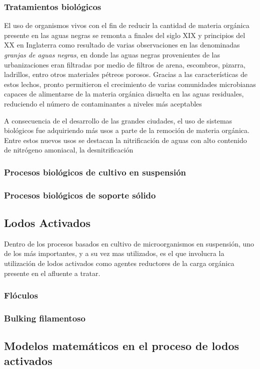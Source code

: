 \subsubsection{Tratamientos biológicos}
El uso de organismos vivos con el fin de reducir la cantidad de materia orgánica presente en las aguas negras se remonta a finales del siglo XIX y principios del XX en Inglaterra como resultado de varias observaciones en las denominadas \emph{granjas de aguas negras}, en donde las aguas negras provenientes de las urbanizaciones eran filtradas por medio de filtros de arena, escombros, pizarra, ladrillos, entro otros materiales pétreos porosos. Gracias a las características de estos lechos, pronto permitieron el crecimiento de varias comunidades microbianas capaces de alimentarse de la materia orgánica disuelta en las aguas residuales, reduciendo el número de contaminantes a niveles más aceptables~\citep{Fair2008}\par
A consecuencia de el desarrollo de las grandes ciudades, el uso de sistemas biológicos fue adquiriendo más usos a parte de la remoción de materia orgánica. Entre estos nuevos usos se destacan la nitrificación de aguas con alto contenido de nitrógeno amoniacal, la desnitrificación 
\subsubsection{Procesos biológicos de cultivo en suspensión}
\subsubsection{Procesos biológicos de soporte sólido}
\subsection{Lodos Activados}
Dentro de los procesos basados en cultivo de microorganismos en suspensión, uno de los más importantes, y a su vez mas utilizados, es el que involucra la utilización de lodos activados como agentes reductores de la carga orgánica presente en el afluente a tratar.
\subsubsection{Flóculos}
\subsubsection{Bulking filamentoso}
\subsection{Modelos matemáticos en el proceso de lodos activados}

